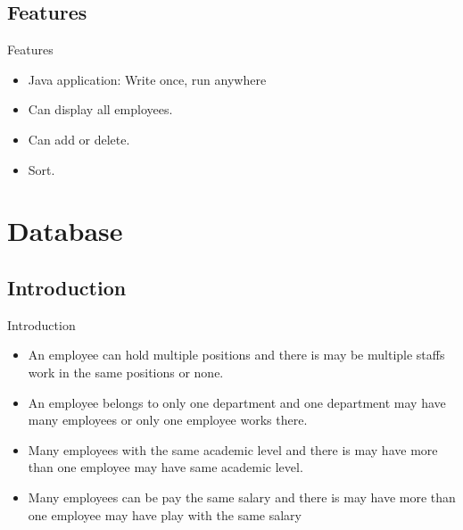 \documentclass{beamer}
\begin{document}
\subsection{Features}

\begin{frame}{Features}
  \begin{itemize}
  \item {
    Java application: Write once, run anywhere
        \pause %
  }
  \item { 
    Can display all employees.  
      }
  \item<3-> {
     Can add or delete.
  }
  \item<4-> {
   Sort. 
  }
  
  \end{itemize}
\end{frame}

\section{Database}

\subsection{Introduction}
\begin{frame}{Introduction}
  \begin{itemize}
  \item {
An employee can hold multiple positions and there is may be multiple staffs work in the same positions or none.
  }
  \item {
 An employee belongs to only one department and one department may have many employees or only one employee works there.
  }
  \item{
Many employees with the same academic level and there is may have more than one employee may have same academic level.

  }
 \item{
  Many employees can be pay the same salary and there is may have more than one employee may have play with the same salary 
}
  \end{itemize}

\end{frame}
\end{document}
